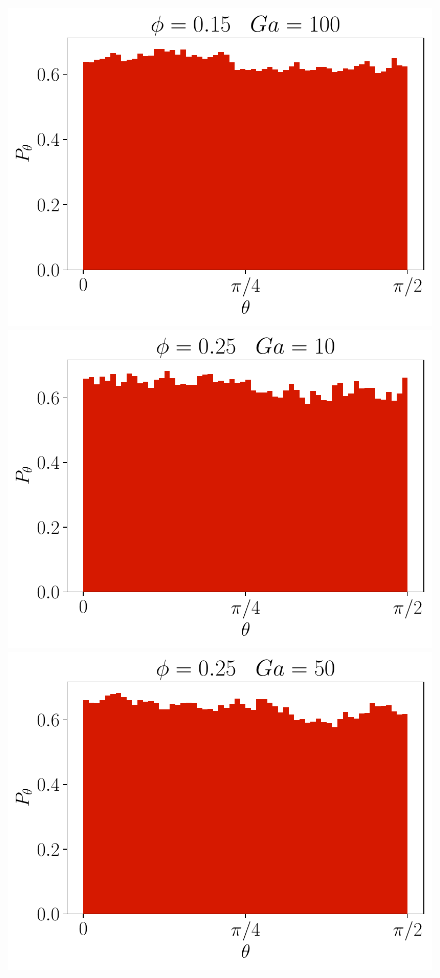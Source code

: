\begin{figure}[h!]
    \includegraphics[height =\size]{image/N_10/beta/2DMAP_theta_dmin_10_Bo1PHI0_15mu_r0_042Ga100.pdf}
    \includegraphics[height =\size]{image/N_10/beta/2DMAP_theta_dmin_10_Bo1PHI0_25mu_r0_042Ga10.pdf}
    \includegraphics[height =\size]{image/N_10/beta/2DMAP_theta_dmin_10_Bo1PHI0_25mu_r0_042Ga50.pdf}

\end{figure}
